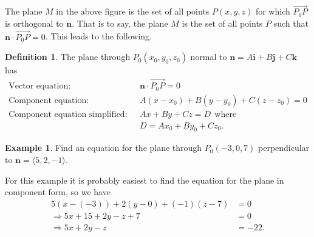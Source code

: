 \documentclass[12pt, letter]{article}
\theoremstyle{plain}
\numberwithin{theorem}{section}
\theoremstyle{definition}
\newtheorem{definition}[theorem]{Definition}
\newtheorem{example}[theorem]{Example}
\begin{document}
\bigskip

The plane $M$ in the above figure is the set of all points $P(x,y,z)$ for which $\vec{P_0P}$ is orthogonal to $\bm{n}$. That is to say, the plane $M$ is the set of all points $P$ such that $\bm{n} \cdot \vec{P_0P} = 0$. This leads to the following.

\bigskip

\begin{definition}
The plane through $P_0(x_0,y_0,z_0)$ normal to $\bm{n} = A\bm{i}+B\bm{j}+C\bm{k}$ has
\begin{align*}
\text{Vector equation:} \ \ \ \ \ &\bm{n}\cdot\vec{P_0P} = 0\\
\text{Component equation:} \ \ \ &A(x-x_0)+B(y-y_0)+C(z-z_0)=0\\
\text{Component equation simplified:} \ \ \ &Ax+By+Cz=D \ \ \text{where}\\ 
&D=Ax_0+By_0+Cz_0.
\end{align*}
\end{definition}

\bigskip

\hrulefill

\bigskip

\begin{example}
Find an equation for the plane through $P_0(-3,0,7)$ perpendicular to $\bm{n} = \langle 5,2,-1 \rangle$.

\smallskip

For this example it is probably easiest to find the equation for the plane in component form, so we have
\begin{align*}
5(x-(-3)) + 2(y-0)+(-1)(z-7) &= 0\\
\Rightarrow 5x+15+2y-z+7 &=0\\
\Rightarrow 5x+2y-z&=-22.
\end{align*}
\end{example}

\bigskip

\hrulefill

\bigskip
\end{document}
